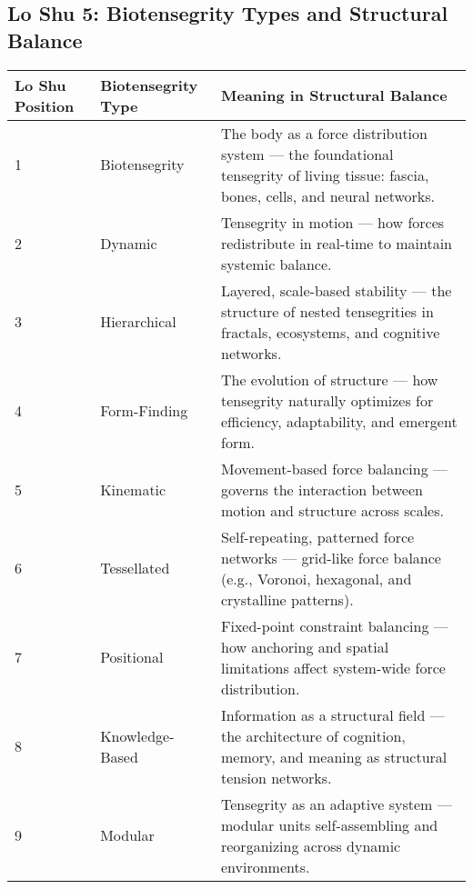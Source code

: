 \documentclass{article}
\begin{document}
\begin{landscape}

\section*{Lo Shu 5: Biotensegrity Types and Structural Balance}

\renewcommand{\arraystretch}{1.4}

\begin{tabular}{|p{1.8cm}|p{4.5cm}|p{9.5cm}|}
\hline
\textbf{Lo Shu Position} & 
\textbf{Biotensegrity Type} & 
\textbf{Meaning in Structural Balance} \\
\hline

1 & 
Biotensegrity & 
The body as a force distribution system — the foundational tensegrity of living tissue: fascia, bones, cells, and neural networks. \\
\hline

2 & 
Dynamic & 
Tensegrity in motion — how forces redistribute in real-time to maintain systemic balance. \\
\hline

3 & 
Hierarchical & 
Layered, scale-based stability — the structure of nested tensegrities in fractals, ecosystems, and cognitive networks. \\
\hline

4 & 
Form-Finding & 
The evolution of structure — how tensegrity naturally optimizes for efficiency, adaptability, and emergent form. \\
\hline

5 & 
Kinematic & 
Movement-based force balancing — governs the interaction between motion and structure across scales. \\
\hline

6 & 
Tessellated & 
Self-repeating, patterned force networks — grid-like force balance (e.g., Voronoi, hexagonal, and crystalline patterns). \\
\hline

7 & 
Positional & 
Fixed-point constraint balancing — how anchoring and spatial limitations affect system-wide force distribution. \\
\hline

8 & 
Knowledge-Based & 
Information as a structural field — the architecture of cognition, memory, and meaning as structural tension networks. \\
\hline

9 & 
Modular & 
Tensegrity as an adaptive system — modular units self-assembling and reorganizing across dynamic environments. \\
\hline

\end{tabular}

\end{landscape}
\end{document}
